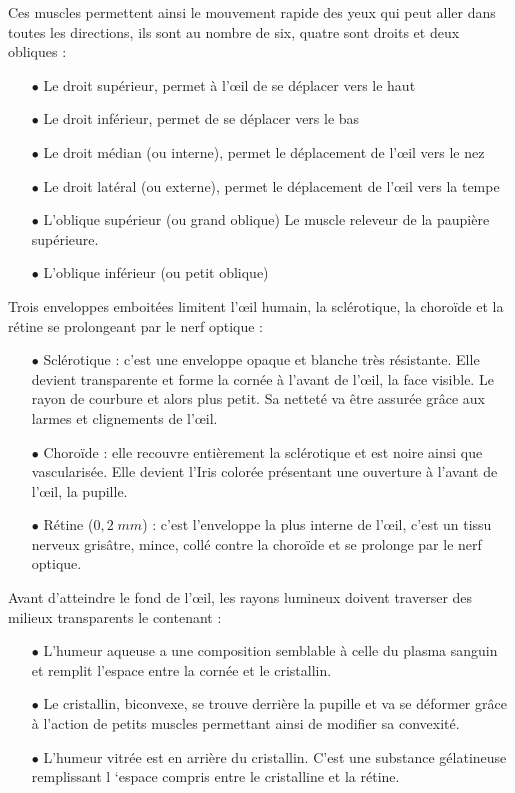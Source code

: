 \documentclass[a4paper, 12pt, onecolumn, openany]{report}
\begin{document}
    Ces muscles permettent ainsi le mouvement rapide des yeux qui peut aller dans toutes les directions, ils sont au nombre de six, quatre sont droits et deux obliques :        
    \begin{itemize}
    \item[$\bullet$] Le droit supérieur, permet à l’œil de se déplacer vers le haut
	\item[$\bullet$] Le droit inférieur, permet de se déplacer vers le bas
	\item[$\bullet$] Le droit médian (ou interne), permet le déplacement de l’œil vers le nez
	\item[$\bullet$] Le droit latéral (ou externe), permet le déplacement de l’œil vers la tempe
	\item[$\bullet$] L’oblique supérieur (ou grand oblique) Le muscle releveur de la paupière supérieure. 
	\item[$\bullet$] L’oblique inférieur (ou petit oblique) 
	\end{itemize}		
    Trois enveloppes emboitées limitent l’œil humain, la sclérotique, la choroïde et la rétine se prolongeant par le nerf optique :
    \begin{itemize}
	\item[$\bullet$] Sclérotique : c’est une enveloppe opaque et blanche très résistante. Elle devient transparente et forme la cornée à l’avant de l’œil, la face visible. Le rayon de courbure et alors plus petit. Sa netteté va être assurée grâce aux larmes et clignements de l’œil.
	\item[$\bullet$] Choroïde : elle recouvre entièrement la sclérotique et est noire ainsi que vascularisée. Elle devient l’Iris colorée présentant une ouverture à l’avant de l’œil, la pupille.  
	\item[$\bullet$] Rétine ($0,2 \; mm$) : c’est l’enveloppe la plus interne de l’œil, c’est un tissu nerveux grisâtre, mince, collé contre la choroïde et se prolonge par le nerf optique. 
	\end{itemize}	
Avant d’atteindre le fond de l’œil, les rayons lumineux doivent traverser des milieux transparents le contenant :
	\begin{itemize}
	\item[$\bullet$] L’humeur aqueuse a une composition semblable à celle du plasma sanguin et remplit l’espace entre la cornée et le cristallin.
	\item[$\bullet$] Le cristallin, biconvexe, se trouve derrière la pupille et va se déformer grâce à l’action de petits muscles permettant ainsi de modifier sa convexité.
	\item[$\bullet$] L’humeur vitrée est en arrière du cristallin. C’est une substance gélatineuse remplissant l ‘espace compris entre le cristalline et la rétine.
	\end{itemize}
	
\end{document}
